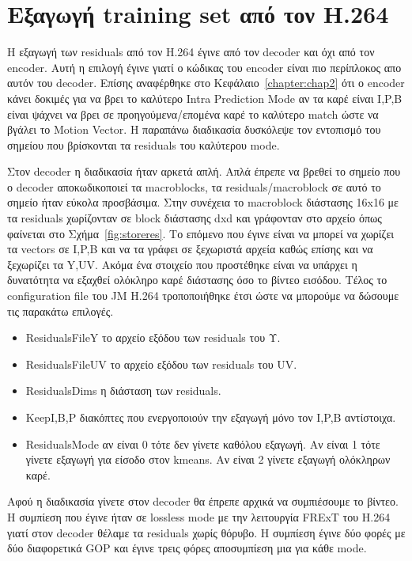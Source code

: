 \newpage

\section{Εξαγωγή training set από τον H.264}
\label{section:sect43}

\indent Η εξαγωγή των residuals από τον H.264 έγινε από τον decoder και όχι από τον encoder. Αυτή η επιλογή έγινε γιατί ο κώδικας του encoder είναι πιο περίπλοκος απο αυτόν του decoder. Επίσης αναφέρθηκε στο Κεφάλαιο~\ref{chapter:chap2} ότι ο encoder κάνει δοκιμές για να βρει το καλύτερο Intra Prediction Mode αν τα καρέ είναι I,P,B είναι ψάχνει να βρει σε προηγούμενα/επομένα καρέ το καλύτερο match ώστε να βγάλει το Motion Vector. Η παραπάνω διαδικασία δυσκόλεψε τον εντοπισμό του σημείου που βρίσκονται τα residuals του καλύτερου mode.

\indent Στον decoder η διαδικασία ήταν αρκετά απλή. Απλά έπρεπε να βρεθεί το σημείο που ο decoder αποκωδικοποιεί τα macroblocks, τα residuals/macroblock σε αυτό το σημείο ήταν εύκολα προσβάσιμα. Στην συνέχεια το macroblock διάστασης 16x16 με τα residuals χωρίζονταν σε block διάστασης dxd και γράφονταν στο αρχείο όπως φαίνεται στο Σχήμα~\ref{fig:storeres}. Το επόμενο που έγινε είναι να μπορεί να χωρίζει τα vectors σε I,P,B και να τα γράφει σε ξεχωριστά αρχεία καθώς επίσης και να ξεχωρίζει τα Y,UV. Ακόμα ένα στοιχείο που προστέθηκε είναι να υπάρχει η δυνατότητα να εξαχθεί ολόκληρο καρέ διάστασης όσο το βίντεο εισόδου. Τέλος το configuration file του JM H.264 τροποποιήθηκε έτσι ώστε να μπορούμε να δώσουμε τις παρακάτω επιλογές.

\begin{itemize}
    \item ResidualsFileY το αρχείο εξόδου των residuals του Υ.
    \item ResidualsFileUV το αρχείο εξόδου των residuals του UV.
    \item ResidualsDims η διάσταση των residuals.
    \item KeepI,B,P διακόπτες που ενεργοποιούν την εξαγωγή μόνο τον I,P,B αντίστοιχα.
    \item ResidualsMode αν είναι 0 τότε δεν γίνετε καθόλου εξαγωγή. Αν είναι 1 τότε γίνετε εξαγωγή για είσοδο στον kmeans. Αν είναι 2 γίνετε εξαγωγή ολόκληρων καρέ.
\end{itemize}

\indent Αφού η διαδικασία γίνετε στον decoder θα έπρεπε αρχικά να συμπιέσουμε το βίντεο. Η συμπίεση που έγινε ήταν σε lossless mode με την λειτουργία FRExT του H.264 γιατί στον decoder θέλαμε τα residuals χωρίς θόρυβο. Η συμπίεση έγινε δύο φορές με δύο διαφορετικά GOP και έγινε τρεις φόρες αποσυμπίεση μια για κάθε mode.

